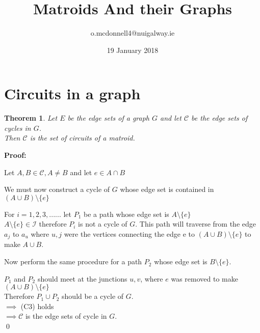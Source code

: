 \documentclass{article}
\title{Matroids And their Graphs}
\author{o.mcdonnell4@nuigalway.ie }
\date{19 January 2018}
\theoremstyle{plain}
\newtheorem{thm}{Theorem}[section]
\theoremstyle{definition}
\theoremstyle{remark}
\newcommand\Proof{%
    \textbf{Proof:}~%
}
\begin{document}
\maketitle
 \section{Circuits in a graph}
 
 \begin{thm}
 Let $E$ be the edge sets of a graph $G$ and let $\mathcal{C}$ be the edge sets of cycles in $G$.\\
 \noindent Then $\mathcal{C}$ is the set of circuits of a matroid.

 \end{thm}

\noindent\textbf\Proof
Let $A, B \in \mathcal{C}, A \neq B $ and let $e \in A \cap B $

\vspace{1mm}

\noindent We must now construct a cycle of $G$ whose edge set is contained in $(A \cup B) \setminus \{e\}$

\vspace{2mm}

\noindent For $ i = 1,2,3,...... $ let $P_1$ be a path whose edge set is $ A \setminus \{e\}$\\
\noindent $ A \setminus \{e\} \in \mathcal{I} $ therefore $P_i$ is not a cycle of $G$. This path will traverse from the edge $a_j$ to $a_u$ where $u,j$ were the vertices connecting the edge e to $(A \cup B) \setminus \{e\}$ to make $A \cup B$.

\vspace{2mm}

\noindent Now perform the same procedure for a path $P_2$ whose edge set is $B \setminus \{e\}$.

\vspace{2mm}

\noindent $P_1$ and $P_2$ should meet at the junctions $u,v$,  where $e$ was removed to make $ (A \cup B) \setminus \{e\}$\\
\noindent Therefore $P_1 \cup P_2$ should be a cycle of $G$.\\
\noindent $\implies$ (C3) holds\\
\noindent $\implies \mathcal{C}$ is the edge sets of cycle in $G$.\\
\qed
\end{document}
